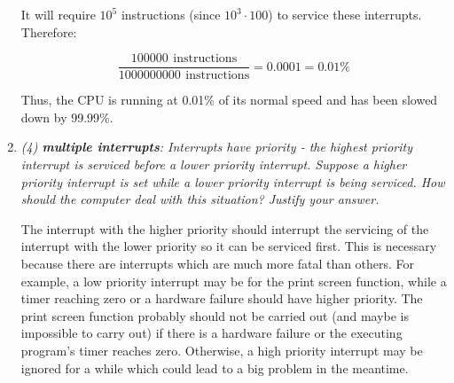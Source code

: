 \documentclass[letterpaper,11pt]{article}
\newcommand{\unit}[1]{\ensuremath{\, \mathrm{#1}}}
\begin{document}
\begin{enumerate}
  It will require $10^5$ instructions (since $10^3 \cdot 100$) to service these interrupts.  Therefore:

  \begin{equation} \frac{100000\ \unit{instructions}}{1000000000\ \unit{instructions}} = 0.0001 = 0.01\%\end{equation}

  Thus, the CPU is running at 0.01\% of its normal speed and has been slowed down by 99.99\%.

  \item \emph{(4) \textbf{multiple interrupts}: Interrupts have priority - the highest priority interrupt is serviced before a lower priority interrupt. Suppose a higher priority interrupt is set while a lower priority interrupt is being serviced. How should the computer deal with this situation? Justify your answer.}

  The interrupt with the higher priority should interrupt the servicing of the interrupt with the lower priority so it can be serviced first.  This is necessary because there are interrupts which are much more fatal than others.  For example, a low priority interrupt may be for the print screen function, while a timer reaching zero or a hardware failure should have higher priority.  The print screen function probably should not be carried out (and maybe is impossible to carry out) if there is a hardware failure or the executing program's timer reaches zero.  Otherwise, a high priority interrupt may be ignored for a while which could lead to a big problem in the meantime.
\end{enumerate}
\end{document}

